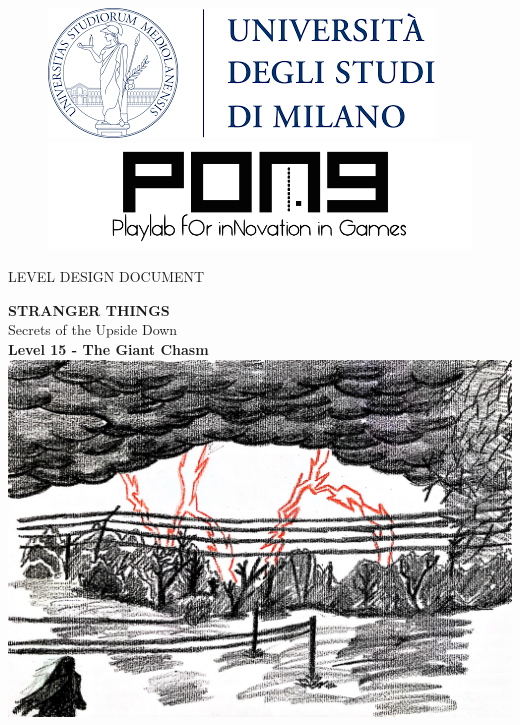 \thispagestyle{empty}
{

	\begin{figure}
		\begin{minipage}{0.5\textwidth}
			\centering
			\includegraphics[width=0.6\linewidth]{images/frontespizio/unimi_logo.png}
		\end{minipage}\hfill
		\begin{minipage}{0.5\textwidth}
			\centering
			\includegraphics[width=0.6\linewidth]{images/frontespizio/pong_logo.png}
		\end{minipage}
	\end{figure}

	\vspace*{0.6cm}
	\begin{center}
		\Huge LEVEL DESIGN DOCUMENT\\
	\end{center}
	
	\vspace{2mm}
	\begin{center}
		\Huge \textbf{STRANGER THINGS}\\
		\Huge {Secrets of the Upside Down}\\
		\huge \textbf{Level 15 - The Giant Chasm}\\
		\vspace*{7mm}
		\includegraphics[width=14cm]{images/frontespizio/cover.jpg}
	\end{center}

}
